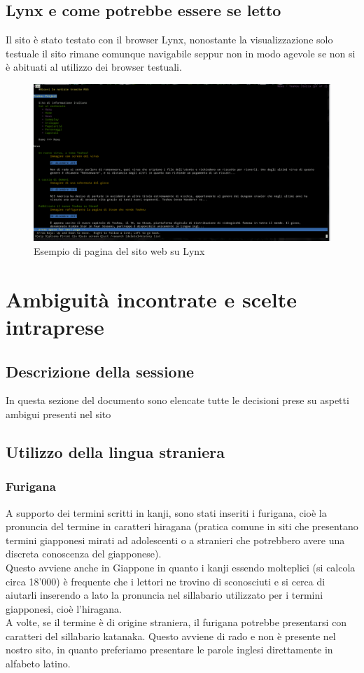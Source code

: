 \documentclass[openany, a4paper, 12pt]{report}
\begin{document}
		\section{Lynx e come potrebbe essere se letto}
			Il sito è stato testato con il browser Lynx, nonostante la visualizzazione solo testuale il sito rimane comunque navigabile seppur non in modo agevole se non si è abituati al utilizzo dei browser testuali.
			\begin{figure}[H]
				\centering
				\includegraphics[width=1.2\linewidth]{images/Lynx2}
				\caption{Esempio di pagina del sito web su Lynx}
			\end{figure}
		

	\chapter{Ambiguità incontrate e scelte intraprese}
		\section{Descrizione della sessione}
			In questa sezione del documento sono elencate tutte le decisioni prese su aspetti ambigui presenti nel sito\\
		\section{Utilizzo della lingua straniera}
			\subsection{Furigana}
				A supporto dei termini scritti in kanji, sono stati inseriti i furigana, cioè la pronuncia del termine in caratteri hiragana (pratica comune in siti che presentano termini giapponesi mirati ad adolescenti o a stranieri che potrebbero avere una discreta conoscenza del giapponese).\\
				Questo avviene anche in Giappone in quanto i kanji essendo molteplici (si calcola circa 18'000) è frequente che i lettori ne trovino di sconosciuti e si cerca di aiutarli inserendo a lato la pronuncia nel sillabario utilizzato per i termini giapponesi, cioè l'hiragana.\\
				A volte, se il termine è di origine straniera, il furigana potrebbe presentarsi con caratteri del sillabario katanaka. Questo avviene di rado e non è presente nel nostro sito, in quanto preferiamo presentare le parole inglesi direttamente in alfabeto latino.
\end{document}
